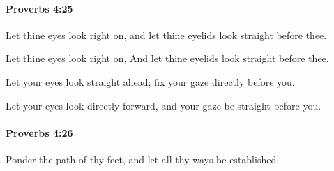 		\paragraph{Proverbs 4:25} %
			\label{PROVERBS-4-25}

			Let thine eyes look right on, and let thine eyelids look straight before thee.

			\begin{versebox}
					\item[BHS] 
					\item[ASV] Let thine eyes look right on, And let thine eyelids look straight before thee.
					\item[NIV] Let your eyes look straight ahead; fix your gaze directly before you.
					\item[NRSV] Let your eyes look directly forward, and your gaze be straight before you.
			\end{versebox}

		\paragraph{Proverbs 4:26} %
			\label{PROVERBS-4-26}

			Ponder the path of thy feet, and let all thy ways be established.

